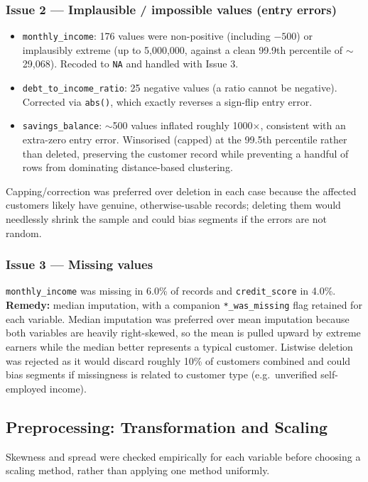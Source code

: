 \documentclass[11pt]{article}
\begin{document}
\subsubsection*{Issue 2 --- Implausible / impossible values (entry errors)}
\begin{itemize}[leftmargin=1.4em]
  \item \texttt{monthly\_income}: 176 values were non-positive (including $-500$) or implausibly extreme (up to 5{,}000{,}000, against a clean 99.9th percentile of $\sim$29{,}068). Recoded to \texttt{NA} and handled with Issue 3.
  \item \texttt{debt\_to\_income\_ratio}: 25 negative values (a ratio cannot be negative). Corrected via \texttt{abs()}, which exactly reverses a sign-flip entry error.
  \item \texttt{savings\_balance}: $\sim$500 values inflated roughly 1000$\times$, consistent with an extra-zero entry error. Winsorised (capped) at the 99.5th percentile rather than deleted, preserving the customer record while preventing a handful of rows from dominating distance-based clustering.
\end{itemize}
Capping/correction was preferred over deletion in each case because the affected customers likely have genuine, otherwise-usable records; deleting them would needlessly shrink the sample and could bias segments if the errors are not random.

\subsubsection*{Issue 3 --- Missing values}
\texttt{monthly\_income} was missing in 6.0\% of records and \texttt{credit\_score} in 4.0\%. \textbf{Remedy:} median imputation, with a companion \texttt{*\_was\_missing} flag retained for each variable. Median imputation was preferred over mean imputation because both variables are heavily right-skewed, so the mean is pulled upward by extreme earners while the median better represents a typical customer. Listwise deletion was rejected as it would discard roughly 10\% of customers combined and could bias segments if missingness is related to customer type (e.g.\ unverified self-employed income).

\subsection{Preprocessing: Transformation and Scaling}

Skewness and spread were checked empirically for each variable before choosing a scaling method, rather than applying one method uniformly.
\end{document}
